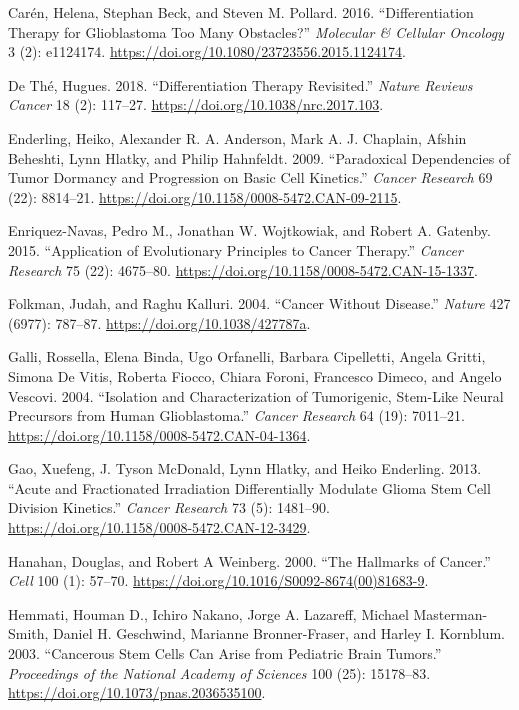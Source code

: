 \documentclass[
  letterpaper,
]{scrreprt}
\newlength{\cslhangindent}
\newenvironment{CSLReferences}[2] %
 {\begin{list}{}{%
  \setlength{\itemindent}{0pt}
  \setlength{\leftmargin}{0pt}
  \setlength{\parsep}{0pt}
  \ifodd #1
   \setlength{\leftmargin}{\cslhangindent}
   \setlength{\itemindent}{-1\cslhangindent}
  \fi
  \setlength{\itemsep}{#2\baselineskip}}}
 {\end{list}}
\theoremstyle{definition}
\theoremstyle{remark}
\begin{document}
\begin{CSLReferences}{1}{0}
Carén, Helena, Stephan Beck, and Steven M. Pollard. 2016.
{``Differentiation Therapy for Glioblastoma {\textendash} Too Many
Obstacles?''} \emph{Molecular \& Cellular Oncology} 3 (2): e1124174.
\url{https://doi.org/10.1080/23723556.2015.1124174}.

De Thé, Hugues. 2018. {``Differentiation Therapy Revisited.''}
\emph{Nature Reviews Cancer} 18 (2): 117--27.
\url{https://doi.org/10.1038/nrc.2017.103}.

Enderling, Heiko, Alexander R. A. Anderson, Mark A. J. Chaplain, Afshin
Beheshti, Lynn Hlatky, and Philip Hahnfeldt. 2009. {``Paradoxical
Dependencies of Tumor Dormancy and Progression on Basic Cell
Kinetics.''} \emph{Cancer Research} 69 (22): 8814--21.
\url{https://doi.org/10.1158/0008-5472.CAN-09-2115}.

Enriquez-Navas, Pedro M., Jonathan W. Wojtkowiak, and Robert A. Gatenby.
2015. {``Application of Evolutionary Principles to Cancer Therapy.''}
\emph{Cancer Research} 75 (22): 4675--80.
\url{https://doi.org/10.1158/0008-5472.CAN-15-1337}.

Folkman, Judah, and Raghu Kalluri. 2004. {``Cancer Without Disease.''}
\emph{Nature} 427 (6977): 787--87.
\url{https://doi.org/10.1038/427787a}.

Galli, Rossella, Elena Binda, Ugo Orfanelli, Barbara Cipelletti, Angela
Gritti, Simona De Vitis, Roberta Fiocco, Chiara Foroni, Francesco
Dimeco, and Angelo Vescovi. 2004. {``Isolation and Characterization of
Tumorigenic, Stem-Like Neural Precursors from Human Glioblastoma.''}
\emph{Cancer Research} 64 (19): 7011--21.
\url{https://doi.org/10.1158/0008-5472.CAN-04-1364}.

Gao, Xuefeng, J. Tyson McDonald, Lynn Hlatky, and Heiko Enderling. 2013.
{``Acute and Fractionated Irradiation Differentially Modulate Glioma
Stem Cell Division Kinetics.''} \emph{Cancer Research} 73 (5): 1481--90.
\url{https://doi.org/10.1158/0008-5472.CAN-12-3429}.

Hanahan, Douglas, and Robert A Weinberg. 2000. {``The Hallmarks of
Cancer.''} \emph{Cell} 100 (1): 57--70.
\url{https://doi.org/10.1016/S0092-8674(00)81683-9}.

Hemmati, Houman D., Ichiro Nakano, Jorge A. Lazareff, Michael
Masterman-Smith, Daniel H. Geschwind, Marianne Bronner-Fraser, and
Harley I. Kornblum. 2003. {``Cancerous Stem Cells Can Arise from
Pediatric Brain Tumors.''} \emph{Proceedings of the National Academy of
Sciences} 100 (25): 15178--83.
\url{https://doi.org/10.1073/pnas.2036535100}.


\end{CSLReferences}
\end{document}
